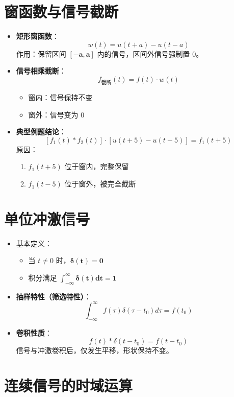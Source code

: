 \section{窗函数与信号截断}
\begin{itemize}
\item \textbf{矩形窗函数}：
  \[
  w(t) = u(t+a) - u(t-a)
  \]
  作用：保留区间 $\boldsymbol{[-a,a]}$ 内的信号，区间外信号强制置 $0$。

\item \textbf{信号相乘截断}：
  \[
  f_{\text{截断}}(t) = f(t) \cdot w(t)
  \]
  \begin{itemize}
  \item 窗内：信号保持不变
  \item 窗外：信号变为 $0$
  \end{itemize}

\item \textbf{典型例题结论}：
  \[
  \left[f_1(t)*f_2(t)\right]\cdot\left[u(t+5)-u(t-5)\right] = f_1(t+5)
  \]
  原因：
  \begin{enumerate}
  \item $f_1(t+5)$ 位于窗内，完整保留
  \item $f_1(t-5)$ 位于窗外，被完全截断
  \end{enumerate}
\end{itemize}

\section{单位冲激信号}
\begin{itemize}
\item 基本定义：
  \begin{itemize}
  \item 当 $t \neq 0$ 时，$\boldsymbol{\delta(t)=0}$
  \item 积分满足 $\boldsymbol{\displaystyle\int_{-\infty}^{\infty}\delta(t)dt=1}$
  \end{itemize}
\item \textbf{抽样特性（筛选特性）}：
  \[
  \int_{-\infty}^{\infty} f(\tau)\delta(\tau-t_0)d\tau = f(t_0)
  \]
\item \textbf{卷积性质}：
  \[
  f(t)*\delta(t-t_0)=f(t-t_0)
  \]
  信号与冲激卷积后，仅发生平移，形状保持不变。
\end{itemize}

\section{连续信号的时域运算}
